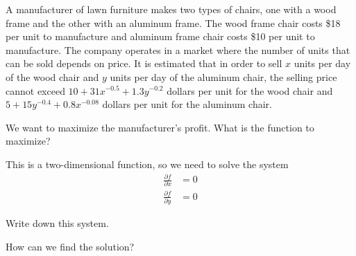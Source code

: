 \documentclass{workbook}
\begin{document}
\begin{slide}

\question

\begin{problem}%
	A manufacturer of lawn furniture makes two types of chairs, one with a wood frame and the other with an aluminum frame. The wood frame chair costs \$18 per unit to manufacture and aluminum frame chair costs \$10 per unit to manufacture. The company operates in a market where the number of units that can be sold depends on price. It is estimated that in order to sell $x$ units per day of the wood chair and $y$ units per day of the aluminum chair, the selling price cannot exceed $10 + 31x^{-0.5} + 1.3y^{-0.2}$ dollars per unit for the wood chair and $5 + 15y^{-0.4} + 0.8x^{-0.08}$ dollars per unit for the aluminum chair.
\end{problem}


\begin{parts}
	\item We want to maximize the manufacturer's profit. What is the function to maximize?
	\item This is a two-dimensional function, so we need to solve the system
	\begin{align*}
		\frac{\partial f}{\partial x} & = 0 \\[5pt]
		\frac{\partial f}{\partial y} & = 0		
	\end{align*}

	Write down this system.
	\item How can we find the solution?
\end{parts}
	
\end{slide}
\end{document}
